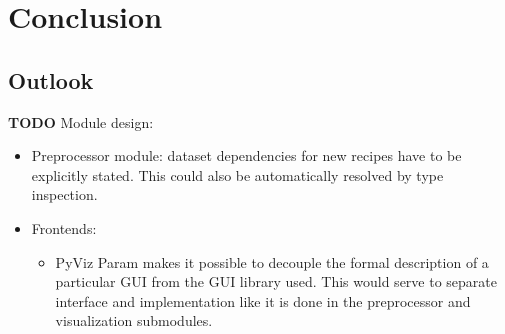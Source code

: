 
\chapter{Conclusion}
\label{chap:conclusion}

\section{Outlook}
\label{sec:outlook}


\textbf{TODO} Module design:
\begin{itemize}
\item Preprocessor module: dataset dependencies for new recipes have to be
    explicitly stated. This could also be automatically resolved by type inspection.
\item Frontends:
    \begin{itemize}
    \item PyViz Param \cite{pyviz-param} makes it possible to decouple the
        formal description of a particular GUI from the GUI library used. This
        would serve to separate interface and implementation like it is done in
        the preprocessor and visualization submodules.
    \end{itemize}
\end{itemize}


